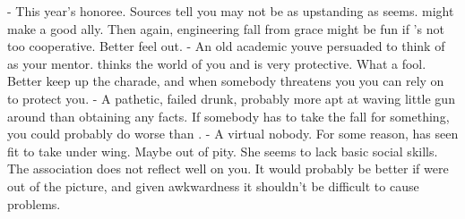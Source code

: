 \documentclass[char]{guildcamp4}
\begin{document}
\begin{contacts}
	\contact{\cMackey{}} - This year's honoree. Sources tell you \cMackey{\they} may not be as upstanding as \cMackey{\they} seems.  might make a good ally. Then again, engineering \cMackey{\their} fall from grace might be fun if 's not too cooperative. Better feel \cMackey{\them}  out.
	\contact{\cHistorian{}} - An old academic youve persuaded to think of  as your mentor.  thinks the world of you and is very protective. What a fool. Better keep up the charade, and when somebody threatens you you can rely on  to protect you.
	\contact{\cMarlowe{}} - A pathetic, failed drunk, probably more apt at waving  little gun around than obtaining any facts. If somebody has to take the fall for something, you could probably do worse than .
	\contact{\cLisbet{}} - A virtual nobody. For some reason, \cHistorian{} has seen fit to take  under  wing. Maybe out of pity. She seems to lack basic social skills. The association does not reflect well on you. It would probably be better if  were out of the picture, and given  awkwardness it shouldn't be difficult to cause  problems.
\end{contacts}
\end{document}
